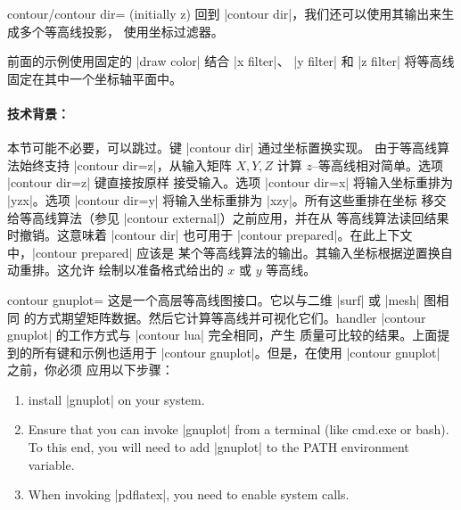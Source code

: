 {{\begin{pgfplotskey}{contour/contour dir= (initially z)}
    回到 |contour dir|，我们还可以使用其输出来生成多个等高线投影，
    使用坐标过滤器。
\pgfplotsexpensiveexample
\begin{codeexample}[]
\end{codeexample}
    \noindent 前面的示例使用固定的 |draw color| 结合 |x filter|、
    |y filter| 和 |z filter| 将等高线固定在其中一个坐标轴平面中。


    \paragraph{技术背景：}

    本节可能不必要，可以跳过。键 |contour dir| 通过坐标置换实现。
    由于等高线算法始终支持 |contour dir=z|，从输入矩阵 $X, Y, Z$
    计算 $z$--等高线相对简单。选项 |contour dir=z| 键直接按原样
    接受输入。选项 |contour dir=x| 将输入坐标重排为 |yzx|。选项
    |contour dir=y| 将输入坐标重排为 |xzy|。所有这些重排在坐标
    移交给等高线算法（参见 |contour external|）之前应用，并在从
    等高线算法读回结果时撤销。这意味着 |contour dir| 也可用于
    |contour prepared|。在此上下文中，|contour prepared| 应该是
    某个等高线算法的输出。其输入坐标根据逆置换自动重排。这允许
    绘制以准备格式给出的 $x$ 或 $y$ 等高线。
\end{pgfplotskey}

\begin{plottype}[/pgfplots]{
    contour gnuplot=\textcolor{black}{}%
}
    这是一个高层等高线图接口。它以与二维 |surf| 或 |mesh| 图相同
    的方式期望矩阵数据。然后它计算等高线并可视化它们。handler
    |contour gnuplot| 的工作方式与 |contour lua| 完全相同，产生
    质量可比较的结果。上面提到的所有键和示例也适用于
    |contour gnuplot|。但是，在使用 |contour gnuplot| 之前，你必须
    应用以下步骤：
\begin{enumerate}
	\item install |gnuplot| on your system.
	\item Ensure that you can invoke |gnuplot| from a terminal (like cmd.exe or bash). To this end, you will need to add |gnuplot| to the PATH environment variable.
	\item When invoking |pdflatex|, you need to enable system calls.


\end{enumerate}
\end{plottype}}}
